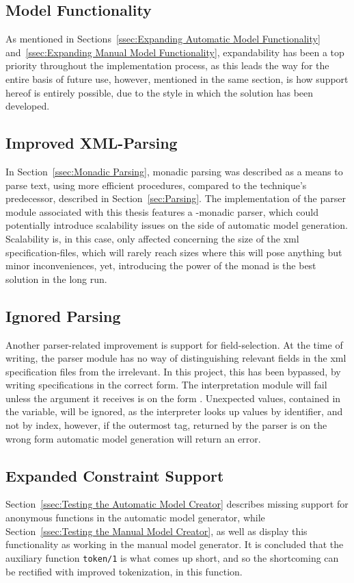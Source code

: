 \subsection{Model Functionality}
As mentioned in Sections~\ref{ssec:Expanding Automatic Model Functionality} and~\ref{ssec:Expanding Manual Model Functionality}, expandability has been a top priority throughout the implementation process, as this leads the way for the entire basis of future use, however, mentioned in the same section, is how support hereof is entirely possible, due to the style in which the solution has been developed. 
\subsection{Improved XML-Parsing}
In Section~\ref{ssec:Monadic Parsing}, monadic parsing was described as a means to parse text, using more efficient procedures, compared to the technique's predecessor, described in Section~\ref{sec:Parsing}. The implementation of the parser module associated with this thesis features a -monadic parser, which could potentially introduce scalability issues on the side of automatic model generation. Scalability is, in this case, only affected concerning the size of the xml specification-files, which will rarely reach sizes where this will pose anything but minor inconveniences, yet, introducing the power of the monad is the best solution in the long run.
\subsection{Ignored Parsing}
Another parser-related improvement is support for field-selection. At the time of writing, the parser module has no way of distinguishing relevant fields in the xml specification files from the irrelevant. In this project, this has been bypassed, by writing specifications in the correct form. The interpretation module will fail unless the argument it receives is on the form . Unexpected values, contained in the  variable, will be ignored, as the interpreter looks up values by identifier, and not by index, however, if the outermost tag, returned by the parser is on the wrong form automatic model generation will return an error.
\newpage
\subsection{Expanded Constraint Support}
Section~\ref{ssec:Testing the Automatic Model Creator} describes missing support for anonymous functions in the automatic model generator, while Section~\ref{ssec:Testing the Manual Model Creator}, as well as  display this functionality as working in the manual model generator. It is concluded that the auxiliary function \lstinline{token/1} is what comes up short, and so the shortcoming can be rectified with improved tokenization, in this function.
